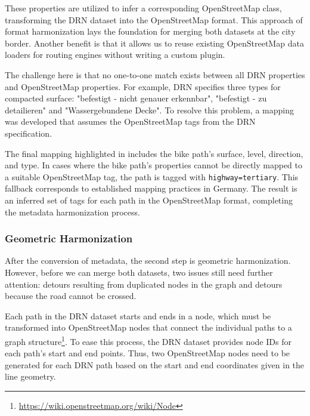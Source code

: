 \begin{table}[!t]
{\begin{tabular}{@{}p{5cm}p{3cm}p{3cm}p{3cm}p{4.9cm}@{}}
\end{tabular}
}
\end{table}

These properties are utilized to infer a corresponding OpenStreetMap class, transforming the DRN dataset into the OpenStreetMap format. This approach of format harmonization lays the foundation for merging both datasets at the city border. Another benefit is that it allows us to reuse existing OpenStreetMap data loaders for routing engines without writing a custom plugin.

The challenge here is that no one-to-one match exists between all DRN properties and OpenStreetMap properties. For example, DRN specifies three types for compacted surface: "befestigt - nicht genauer erkennbar", "befestigt - zu detailieren" and "Wassergebundene Decke". To resolve this problem, a mapping was developed that assumes the OpenStreetMap tags from the DRN specification. 

The final mapping highlighted in  includes the bike path's surface, level, direction, and type. In cases where the bike path's properties cannot be directly mapped to a suitable OpenStreetMap tag, the path is tagged with \texttt{highway=tertiary}. This fallback corresponds to established mapping practices in Germany. The result is an inferred set of tags for each path in the OpenStreetMap format, completing the metadata harmonization process.

\subsubsection{Geometric Harmonization}

After the conversion of metadata, the second step is geometric harmonization. However, before we can merge both datasets, two issues still need further attention: detours resulting from duplicated nodes in the graph and detours because the road cannot be crossed. 

Each path in the DRN dataset starts and ends in a node, which must be transformed into OpenStreetMap nodes that connect the individual paths to a graph structure\footnote{\url{https://wiki.openstreetmap.org/wiki/Node}}. To ease this process, the DRN dataset provides node IDs for each path's start and end points. Thus, two OpenStreetMap nodes need to be generated for each DRN path based on the start and end coordinates given in the line geometry. 

